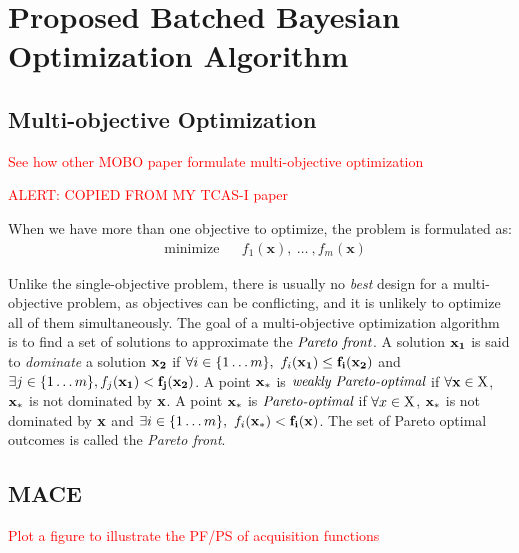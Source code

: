 \section{Proposed Batched Bayesian Optimization Algorithm}

\subsection{Multi-objective Optimization}\label{sec:MOForumlation}

\textcolor{red}{See how other MOBO paper formulate multi-objective optimization}


\textcolor{red}{ALERT: COPIED FROM MY TCAS-I paper}

When we have more than one objective to optimize, the problem is formulated as:
\begin{equation}
    \label{eq:MOFormulation}
    \begin{aligned}
        & \text{minimize} & & f_1(\mathbf{x}),~\dots~,f_m(\mathbf{x})
    \end{aligned}
\end{equation}

Unlike the single-objective problem, there is usually no \emph{best} design for
a multi-objective problem, as objectives can be conflicting, and it is unlikely
to optimize all of them simultaneously. The goal of a multi-objective
optimization algorithm is to find a set of solutions to approximate the
$\emph{Pareto front}$. A solution $\bf{x}_1$ is said to \emph{dominate} a
solution $\bf{x}_2$ if $\forall i \in \{1 \dots m\},~f_i(\bf{x}_1) \le
f_i(\bf{x}_2)$ and $\exists j \in \{1\dots m\}, f_j(\bf{x}_1) < f_j(\bf{x}_2)$.
A point $\bf{x}_*$ is $\emph{weakly Pareto-optimal}$ if $\forall \bf{x} \in
\bf{\textrm{X}}$, $\bf{x}_*$ is not dominated by $\bf{x}$.  A point $\bf{x}_*$
is $\emph{Pareto-optimal}$ if $\forall x \in \bf{\textrm{X}}$, $\bf{x}_*$ is
not dominated by $\bf{x}$ and $\exists i \in \{1 \dots m\},~f_i(\bf{x}_*) <
f_i(\bf{x})$. The set of Pareto optimal outcomes is called the \emph{Pareto
front}.

\subsection{MACE}


\textcolor{red}{Plot a figure to illustrate the PF/PS of acquisition functions}
